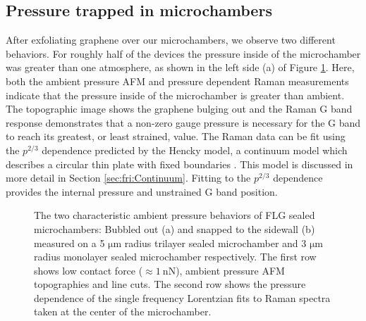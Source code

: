 \subsection{Pressure trapped in microchambers\label{sec:fri:ambient}}
After exfoliating graphene over our microchambers, we observe two different behaviors.
For roughly half of the devices the pressure inside of the microchamber was greater than one atmosphere, as shown in the left side (a) of Figure \ref{fig:fri:ambient}.
Here, both the ambient pressure AFM and pressure dependent Raman measurements indicate that the pressure inside of the microchamber is greater than ambient.
The topographic image shows the graphene bulging out and the Raman G band response demonstrates that a non-zero gauge pressure is necessary for the G band to reach its greatest, or least strained, value.
The Raman data can be fit using the $p^{2/3}$ dependence predicted by the Hencky model, a continuum model which describes a circular thin plate with fixed boundaries \cite{Hencky1915}.
This model is discussed in more detail in Section \ref{sec:fri:Continuum}.
Fitting to the $p^{2/3}$ dependence provides the internal pressure and unstrained G band position.

\begin{figure}
	\begin{center}
	
	\end{center}
	\caption[Characteristic ambient pressure behavior of FLG sealed microchambers]{\label{fig:fri:ambient}
	The two characteristic ambient pressure behaviors of FLG sealed microchambers: Bubbled out (a) and snapped to the sidewall (b) measured on a 5 $\mathrm{\mu}$m radius trilayer sealed microchamber and 3 $\mathrm{\mu}$m radius monolayer sealed microchamber respectively.
	The first row shows low contact force ($\approx 1\ \mathrm{nN}$), ambient pressure AFM topographies and line cuts.
	The second row shows the pressure dependence of the single frequency Lorentzian fits to Raman spectra taken at the center of the microchamber.}
\end{figure}

